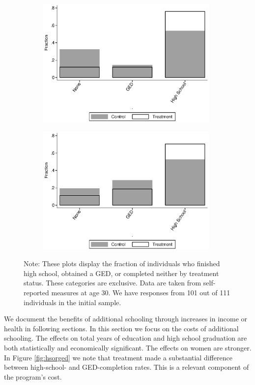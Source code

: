 \begin{figure}[H]
\begin{center}
\caption{High School and GED} \label{fig:hsorged}
\begin{subfigure}{.5\textwidth}
\label{subfig:hs_stat_female}
\includegraphics[height=2.5in]{AppOutput/Education/hsorged_female_age30.eps}
\end{subfigure}
\begin{subfigure}{.5\textwidth}
\label{subfig:hs_stat_male}
\includegraphics[height=2.5in]{AppOutput/Education/hsorged_male_age30.eps}
\end{subfigure}
{\footnotesize \flushleft Note: These plots display the fraction of individuals who finished high school, obtained a GED, or completed neither by treatment status. These categories are exclusive. Data are taken from self-reported measures at age 30. We have responses from 101 out of 111 individuals in the initial sample.\\}
\end{center}
\end{figure}

\noindent We document the benefits of additional schooling through increases in income or health in following sections. In this section we focus on the costs of additional schooling. The effects on total years of education and high school graduation are both statistically and economically significant. The effects on women are stronger. In Figure \ref{fig:hsorged} we note that treatment made a substantial difference between high-school- and GED-completion rates. This is a relevant component of the program's cost. \\

